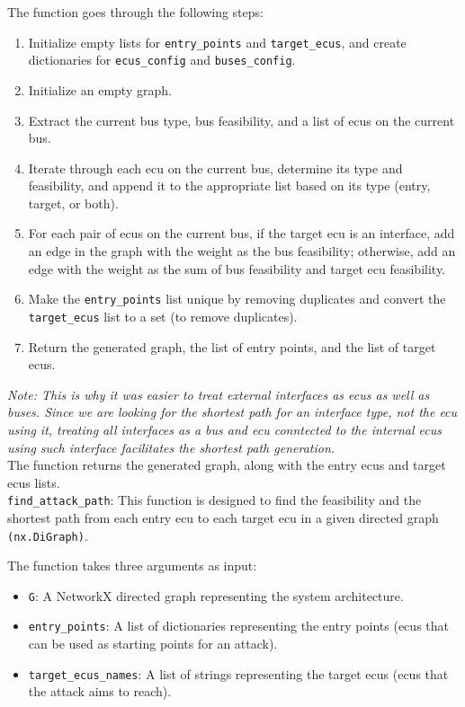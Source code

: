 The function goes through the following steps:
\begin{enumerate}
    \item Initialize empty lists for \texttt{entry\_points} and \texttt{target\_ecus}, 
        and create dictionaries for \texttt{ecus\_config} and \texttt{buses\_config}.
    \item Initialize an empty graph.
    \item Extract the current bus type, bus feasibility, and a list of \gls{ecu}s on the current bus.
    \item Iterate through each \gls{ecu} on the current bus, determine its type and feasibility, and append it to the 
        appropriate list based on its type (entry, target, or both).
    \item For each pair of \gls{ecu}s on the current bus, if the target \gls{ecu} is an interface, 
        add an edge in the graph with the weight as the bus feasibility; 
        otherwise, add an edge with the weight as the sum of bus feasibility and target \gls{ecu} feasibility.
    \item Make the \texttt{entry\_points} list unique by removing duplicates and convert the \texttt{target\_ecus} list to a set (to remove duplicates).
    \item Return the generated graph, the list of entry points, and the list of target \gls{ecu}s.
\end{enumerate}

\textit{Note: This is why it was easier to treat external interfaces as \gls{ecu}s as well as buses.
Since we are looking for the shortest path for an interface type, not the \gls{ecu} using it, treating all interfaces
as a bus and \gls{ecu} conntected to the internal \gls{ecu}s using such interface facilitates the shortest path generation.}\\
The function returns the generated graph, along with the entry \gls{ecu}s and target \gls{ecu}s lists.\\


\texttt{find\_attack\_path}: 
This function is designed to find the feasibility and the shortest path from each entry \gls{ecu} 
to each target \gls{ecu} in a given directed graph \texttt{(nx.DiGraph)}.

The function takes three arguments as input:
\begin{itemize}
    \item \texttt{G}: A NetworkX directed graph representing the system architecture.
    \item \texttt{entry\_points}: A list of dictionaries representing the entry points (\gls{ecu}s that can be used as starting points for an attack).
    \item \texttt{target\_ecus\_names}: A list of strings representing the target \gls{ecu}s (\gls{ecu}s that the attack aims to reach).
\end{itemize}

